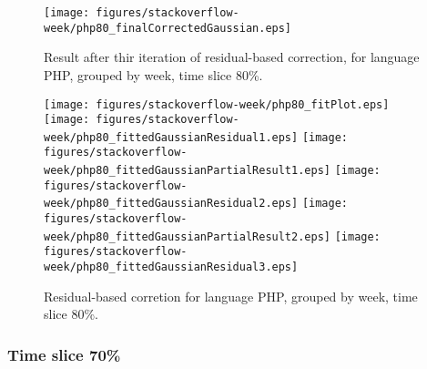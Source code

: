 \begin{figure}[]
\centering
{\texttt{[image: figures/stackoverflow-week/php80\_finalCorrectedGaussian.eps]}}
\caption{Result after thir iteration of residual-based correction, for language PHP, grouped by week, time slice 80\%.}
\end{figure}


\begin{figure}[hb]
\centering
{}
{\texttt{[image: figures/stackoverflow-week/php80\_fitPlot.eps]}}
{\texttt{[image: figures/stackoverflow-week/php80\_fittedGaussianResidual1.eps]}}
{\texttt{[image: figures/stackoverflow-week/php80\_fittedGaussianPartialResult1.eps]}}
{\texttt{[image: figures/stackoverflow-week/php80\_fittedGaussianResidual2.eps]}}
{\texttt{[image: figures/stackoverflow-week/php80\_fittedGaussianPartialResult2.eps]}}
{\texttt{[image: figures/stackoverflow-week/php80\_fittedGaussianResidual3.eps]}}
\caption{Residual-based corretion for language PHP, grouped by week, time slice 80\%.}
\end{figure}


\clearpage 
\newpage 


\FloatBarrier

\subsubsection{Time slice 70\%}

